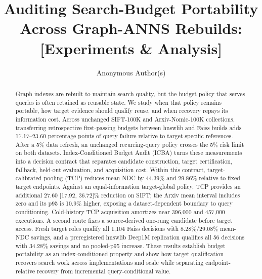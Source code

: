 \documentclass[sigconf,anonymous]{acmart}
\title[Auditing Search-Budget Portability]{Auditing Search-Budget Portability Across Graph-ANNS Rebuilds: [Experiments \& Analysis]}
\author{Anonymous Author(s)}
\begin{document}
\begin{abstract}
Graph indexes are rebuilt to maintain search quality, but the budget policy that serves queries is often retained as reusable state. We study when that policy remains portable, how target evidence should qualify reuse, and when recovery repays its information cost. Across unchanged SIFT-100K and Arxiv-Nomic-100K collections, transferring retrospective first-passing budgets between hnswlib and Faiss builds adds 17.17--23.60 percentage points of query failure relative to target-specific references. After a 5\% data refresh, an unchanged recurring-query policy crosses the 5\% risk limit on both datasets. Index-Conditioned Budget Audit (ICBA) turns these measurements into a decision contract that separates candidate construction, target certification, fallback, held-out evaluation, and acquisition cost. Within this contract, target-calibrated pooling (TCP) reduces mean NDC by 44.39\% and 29.86\% relative to fixed target endpoints. Against an equal-information target-global policy, TCP provides an additional 27.60 [17.92, 36.72]\% reduction on SIFT; the Arxiv mean interval includes zero and its p95 is 10.9\% higher, exposing a dataset-dependent boundary to query conditioning. Cold-history TCP acquisition amortizes near 396,000 and 457,000 executions. A second route fixes a source-derived one-rung candidate before target access. Fresh target roles qualify all 1,104 Faiss decisions with 8.28\%/29.08\% mean-NDC savings, and a preregistered hnswlib Deep1M replication qualifies all 56 decisions with 34.28\% savings and no pooled-p95 increase. These results establish budget portability as an index-conditioned property and show how target qualification recovers search work across implementations and scale while separating endpoint-relative recovery from incremental query-conditional value.
\end{abstract}
\maketitle
\raggedbottom











\balance


\end{document}
